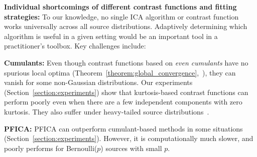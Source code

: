 \documentclass[letterpaper]{article}
\newcommand{\bg}{\pmb{g}}
\newcommand{\var}{\text{var}}
\begin{document}


\vspace{-1pt}

\textbf{Individual shortcomings of different contrast functions and fitting strategies:} %
To our knowledge, no single ICA algorithm or contrast function works universally across all source distributions. Adaptively determining which algorithm is useful in a given setting would be an important tool in a practitioner's toolbox.
Key challenges include:

     \textbf{Cumulants:} Even though contrast functions based on \textit{even cumulants} have no spurious local optima (Theorem~\ref{theorem:global_convergence},~\cite{NIPS2015_89f03f7d}), they can vanish for some non-Gaussian distributions. Our experiments (Section~\ref{section:experiments}) show that kurtosis-based contrast functions can perform poorly even when there are a few independent components with zero kurtosis. They also suffer under heavy-tailed source distributions~\cite{rademacher2017heavy,chen2005ICA,hyvarinen1997ica}.

     \textbf{PFICA:} PFICA can outperform cumulant-based methods in some situations (Section~\ref{section:experiments}). However, it is computationally much slower, and poorly performs for Bernoulli($p$) sources with small $p$.
     
\end{document}
